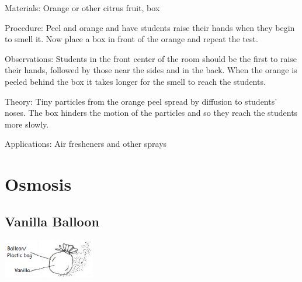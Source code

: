 \begin{multicols}{2}
\begin{description*}
\item[Materials:]{Orange or other citrus fruit, box}
\item[Procedure:]{Peel and orange and have students raise their hands when they begin to smell it. Now place a box in front of the orange and repeat the test.}
\item[Observations:]{Students in the front center of the room should be the first to raise their hands, followed by those near the sides and in the back. When the orange is peeled behind the box it takes longer for the smell to reach the students.}
\item[Theory:]{Tiny particles from the orange peel spread by diffusion to students' noses. The box hinders the motion of the particles and so they reach the students more slowly.}
\item[Applications:]{Air fresheners and other sprays}
\end{description*}


\section*{Osmosis}


\subsection{Vanilla Balloon}

\begin{center}
\includegraphics[width=0.3\textwidth]{./img/vso/osmosis-vanilla.png}
\end{center}


\end{multicols}
